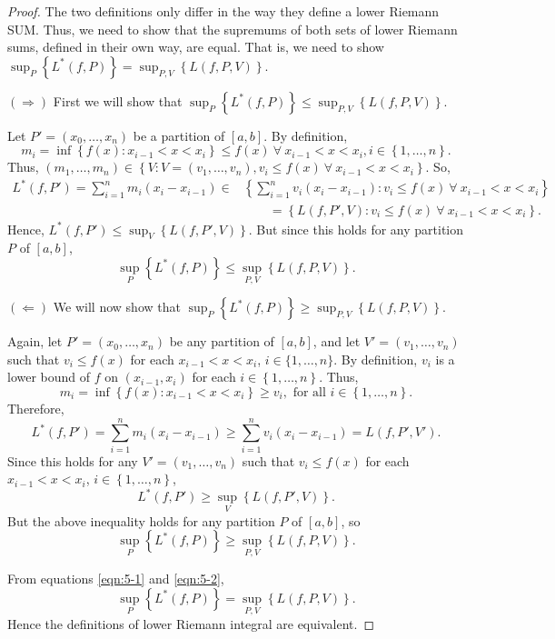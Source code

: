 \documentclass[12pt]{article}
\begin{document}
\begin{proof}
The two definitions only differ in the way they define a lower Riemann SUM. Thus, we need to show that the supremums of both sets of lower Riemann
sums, defined in their own way, are equal. That is, we need to show $\sup_{P}\left\{ L^{*}(f,P) \right\} = \sup_{P,V}\left\{ L(f,P,V) \right\}$.

$(\Rightarrow)$ First we will show that $\sup_{P}\left\{ L^{*}(f,P) \right\} \leq \sup_{P,V}\left\{ L(f,P,V) \right\}$. 

Let $P' = (x_{0}, \dots, x_{n})$ be a partition of $[a,b]$. By definition,
\[ m_{i} = \inf\left\{ f(x) : x_{i-1} < x < x_{i} \right\} \leq f(x)\ \forall\ x_{i-1} < x < x_{i}, i \in \left\{ 1, \dots, n \right\}. \]
Thus, $(m_{1}, \dots, m_{n}) \in \left\{ V : V = (v_{1}, \dots, v_{n}), v_{i} \leq f(x)\ \forall\ x_{i-1} < x < x_{i} \right\}$. So,
\begin{align*}
L^{*}(f, P') = \sum_{i=1}^{n}m_{i}(x_{i}-x_{i-1}) \in& \left\{ \sum_{i=1}^{n}v_{i}(x_{i}-x_{i-1}) : v_{i} \leq f(x)\ \forall\ x_{i-1} < x < x_{i}
\right\} \\
&\qquad = \left\{ L(f,P',V) : v_{i} \leq f(x) \ \forall\ x_{i-1} < x < x_{i} \right\}. 
\end{align*}
Hence, $L^{*}(f,P') \leq \sup_{V}\left\{ L(f,P',V) \right\}$. But since this holds for any partition $P$ of $[a,b]$,
\begin{equation}
\sup_{P}\left\{ L^{*}(f,P) \right\} \leq \sup_{P,V}\left\{ L(f,P,V) \right\}.
\label{eqn:5-1}
\end{equation}

$(\Leftarrow)$ We will now show that $\sup_{P}\left\{ L^{*}(f,P) \right\} \geq \sup_{P,V}\left\{ L(f,P,V) \right\}$. 

Again, let $P' = (x_{0}, \dots, x_{n})$ be any partition of $[a,b]$, and let $V' = (v_{1}, \dots, v_{n})$ such that $v_{i} \leq f(x)$ for each
$x_{i-1} < x < x_{i}$, $i \in \{1, \dots, n\}$. By definition, $v_{i}$ is a lower bound of $f$ on $(x_{i-1}, x_{i})$ for each $i \in \left\{ 1, \dots,
n \right\}$. Thus, 
\[ m_{i} = \inf\left\{ f(x) : x_{i-1} < x < x_{i} \right\} \geq v_{i}, \text{ for all } i \in \left\{ 1,\dots,n \right\}.\]
Therefore,
\[ L^{*}(f,P') = \sum_{i=1}^{n}m_{i}(x_{i}-x_{i-1}) \geq \sum_{i=1}^{n}v_{i}(x_{i}-x_{i-1}) = L(f,P',V'). \]
Since this holds for any $V' = (v_{1}, \dots, v_{n})$ such that $v_{i} \leq f(x)$ for each $x_{i-1} < x < x_{i}$, $i \in \left\{ 1,\dots, n \right\}$, 
\[ L^{*}(f, P') \geq \sup_{V}\left\{ L(f,P',V) \right\}. \]
But the above inequality holds for any partition $P$ of $[a,b]$, so 
\begin{equation}
\sup_{P}\left\{ L^{*}(f,P) \right\} \geq \sup_{P,V}\left\{ L(f,P,V) \right\}.
\label{eqn:5-2}
\end{equation}

From equations \ref{eqn:5-1} and \ref{eqn:5-2}, 
\[ \sup_{P}\left\{ L^{*}(f,P) \right\} = \sup_{P,V}\left\{ L(f,P,V) \right\}. \]
Hence the definitions of lower Riemann integral are equivalent.
\end{proof}
\end{document}
